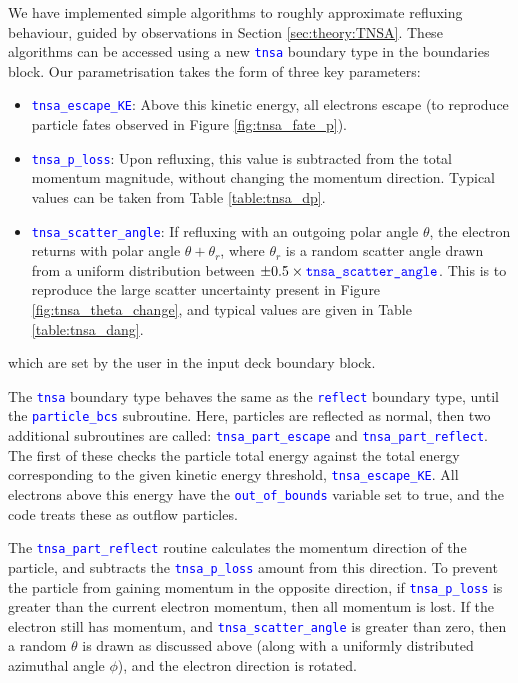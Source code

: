 \documentclass[12pt]{article}
\numberwithin{equation}{section}
\begin{document}
We have implemented simple algorithms to roughly approximate refluxing behaviour, guided by observations in Section \ref{sec:theory:TNSA}. These algorithms can be accessed using a new \textcolor{blue}{\texttt{tnsa}} boundary type in the boundaries block. Our parametrisation takes the form of three key parameters:
%
\begin{itemize}
  \item \textcolor{blue}{\texttt{tnsa\_escape\_KE}}: Above this kinetic energy, all electrons escape (to reproduce particle fates observed in Figure \ref{fig:tnsa_fate_p}).
%
  \item \textcolor{blue}{\texttt{tnsa\_p\_loss}}: Upon refluxing, this value is subtracted from the total momentum magnitude, without changing the momentum direction. Typical values can be taken from Table \ref{table:tnsa_dp}.
% 
  \item \textcolor{blue}{\texttt{tnsa\_scatter\_angle}}: If refluxing with an outgoing polar angle $\theta$, the electron returns with polar angle $\theta + \theta_r$, where $\theta_r$ is a random scatter angle drawn from a uniform distribution between $\pm 0.5 \times \text{\textcolor{blue}{\texttt{tnsa\_scatter\_angle}}}$. This is to reproduce the large scatter uncertainty present in Figure \ref{fig:tnsa_theta_change}, and typical values are given in Table \ref{table:tnsa_dang}.
%
\end{itemize}
%
which are set by the user in the input deck boundary block.

The \textcolor{blue}{\texttt{tnsa}} boundary type behaves the same as the \textcolor{blue}{\texttt{reflect}} boundary type, until the \textcolor{blue}{\texttt{particle\_bcs}} subroutine. Here, particles are reflected as normal, then two additional subroutines are called: \textcolor{blue}{\texttt{tnsa\_part\_escape}} and \textcolor{blue}{\texttt{tnsa\_part\_reflect}}. The first of these checks the particle total energy against the total energy corresponding to the given kinetic energy threshold, \textcolor{blue}{\texttt{tnsa\_escape\_KE}}. All electrons above this energy have the \textcolor{blue}{\texttt{out\_of\_bounds}} variable set to true, and the code treats these as outflow particles.

The \textcolor{blue}{\texttt{tnsa\_part\_reflect}} routine calculates the momentum direction of the particle, and subtracts the \textcolor{blue}{\texttt{tnsa\_p\_loss}} amount from this direction. To prevent the particle from gaining momentum in the opposite direction, if \textcolor{blue}{\texttt{tnsa\_p\_loss}} is greater than the current electron momentum, then all momentum is lost. If the electron still has momentum, and \textcolor{blue}{\texttt{tnsa\_scatter\_angle}} is greater than zero, then a random $\theta$ is drawn as discussed above (along with a uniformly distributed azimuthal angle $\phi$), and the electron direction is rotated.
\end{document}
